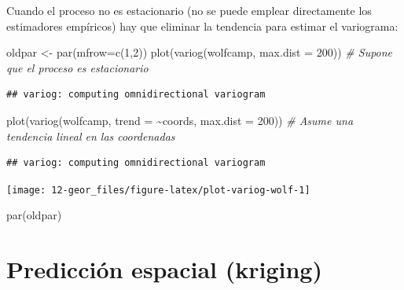 \documentclass[
  spanish,
]{book}
\newenvironment{Shaded}{\begin{snugshade}}{\end{snugshade}}
\newcommand{\AttributeTok}[1]{\textcolor[rgb]{0.77,0.63,0.00}{#1}}
\newcommand{\CommentTok}[1]{\textcolor[rgb]{0.56,0.35,0.01}{\textit{#1}}}
\newcommand{\DecValTok}[1]{\textcolor[rgb]{0.00,0.00,0.81}{#1}}
\newcommand{\FunctionTok}[1]{\textcolor[rgb]{0.00,0.00,0.00}{#1}}
\newcommand{\NormalTok}[1]{#1}
\newcommand{\OtherTok}[1]{\textcolor[rgb]{0.56,0.35,0.01}{#1}}
\newcommand{\SpecialCharTok}[1]{\textcolor[rgb]{0.00,0.00,0.00}{#1}}
\theoremstyle{break}
\begin{document}
Cuando el proceso no es estacionario (no se puede emplear directamente los
estimadores empíricos) hay que eliminar la tendencia para estimar el variograma:

\begin{Shaded}
\begin{Highlighting}[]
\NormalTok{oldpar }\OtherTok{\textless{}{-}} \FunctionTok{par}\NormalTok{(}\AttributeTok{mfrow=}\FunctionTok{c}\NormalTok{(}\DecValTok{1}\NormalTok{,}\DecValTok{2}\NormalTok{)) }
\FunctionTok{plot}\NormalTok{(}\FunctionTok{variog}\NormalTok{(wolfcamp, }\AttributeTok{max.dist =} \DecValTok{200}\NormalTok{)) }\CommentTok{\# Supone que el proceso es estacionario}
\end{Highlighting}
\end{Shaded}

\begin{verbatim}
## variog: computing omnidirectional variogram
\end{verbatim}

\begin{Shaded}
\begin{Highlighting}[]
\FunctionTok{plot}\NormalTok{(}\FunctionTok{variog}\NormalTok{(wolfcamp, }\AttributeTok{trend =} \SpecialCharTok{\textasciitilde{}}\NormalTok{coords, }\AttributeTok{max.dist =} \DecValTok{200}\NormalTok{)) }\CommentTok{\# Asume una tendencia lineal en las coordenadas}
\end{Highlighting}
\end{Shaded}

\begin{verbatim}
## variog: computing omnidirectional variogram
\end{verbatim}

\begin{center}\texttt{[image: 12-geor\_files/figure-latex/plot-variog-wolf-1]} \end{center}

\begin{Shaded}
\begin{Highlighting}[]
\FunctionTok{par}\NormalTok{(oldpar)}
\end{Highlighting}
\end{Shaded}

\hypertarget{predicciuxf3n-espacial-kriging}{%
\section{Predicción espacial (kriging)}\label{predicciuxf3n-espacial-kriging}}
\end{document}
